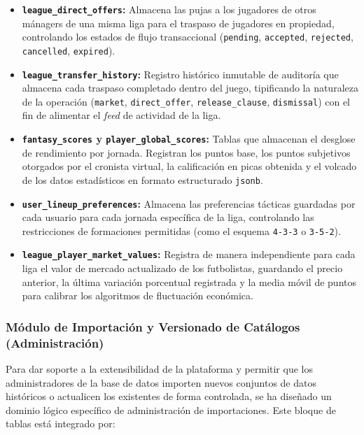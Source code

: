 \begin{itemize}
    \item \textbf{\texttt{league\_direct\_offers}:} Almacena las pujas a los jugadores de otros mánagers de una misma liga para el traspaso de jugadores en propiedad, controlando los estados de flujo transaccional (\texttt{pending}, \texttt{accepted}, \texttt{rejected}, \texttt{cancelled}, \texttt{expired}).
    \item \textbf{\texttt{league\_transfer\_history}:} Registro histórico inmutable de auditoría que almacena cada traspaso completado dentro del juego, tipificando la naturaleza de la operación (\texttt{market}, \texttt{direct\_offer}, \texttt{release\_clause}, \texttt{dismissal}) con el fin de alimentar el \textit{feed} de actividad de la liga.
    \item \textbf{\texttt{fantasy\_scores} y \texttt{player\_global\_scores}:} Tablas que almacenan el desglose de rendimiento por jornada. Registran los puntos base, los puntos subjetivos otorgados por el cronista virtual, la calificación en picas obtenida y el volcado de los datos estadísticos en formato estructurado \texttt{jsonb}.
    \item \textbf{\texttt{user\_lineup\_preferences}:} Almacena las preferencias tácticas guardadas por cada usuario para cada jornada específica de la liga, controlando las restricciones de formaciones permitidas (como el esquema \texttt{4-3-3} o \texttt{3-5-2}).
    \item \textbf{\texttt{league\_player\_market\_values}:} Registra de manera independiente para cada liga el valor de mercado actualizado de los futbolistas, guardando el precio anterior, la última variación porcentual registrada y la media móvil de puntos para calibrar los algoritmos de fluctuación económica.
\end{itemize}

\subsubsection{Módulo de Importación y Versionado de Catálogos (Administración)}
Para dar soporte a la extensibilidad de la plataforma y permitir que los administradores de la base de datos importen nuevos conjuntos de datos históricos o actualicen los existentes de forma controlada, se ha diseñado un dominio lógico específico de administración de importaciones. Este bloque de tablas está integrado por:

